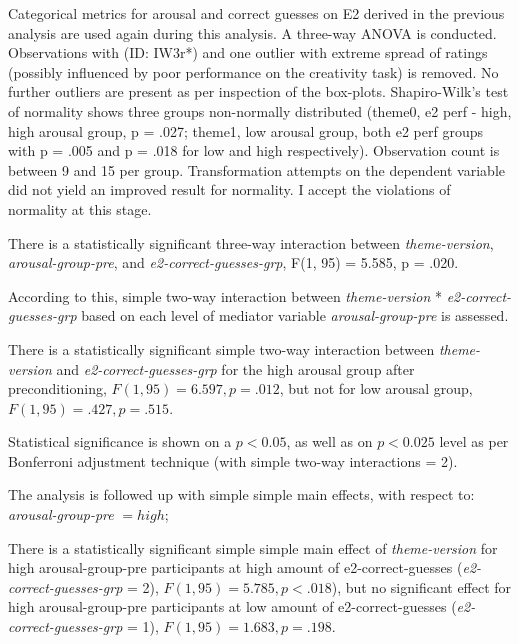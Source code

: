 	Categorical metrics for arousal and correct guesses on E2 derived in the previous analysis are used again during this analysis. A three-way ANOVA is conducted. Observations with (ID: IW3r*) and one outlier with extreme spread of ratings (possibly influenced by poor performance on the creativity task) is removed. No further outliers are present as per inspection of the box-plots.
	Shapiro-Wilk's test of normality shows three groups non-normally distributed (theme0, e2 perf - high, high arousal group, p = .027; theme1, low arousal group, both e2 perf groups with p = .005 and p = .018 for low and high respectively). Observation count is between 9 and 15 per group. Transformation attempts on the dependent variable did not yield an improved result for normality. I accept the violations of normality at this stage.
			      
	There is a statistically significant three-way interaction between \textit{theme-version}, \textit{arousal-group-pre}, and \textit{e2-correct-guesses-grp}, 
	F(1, 95) = 5.585, p = .020.
	
	According to this, simple two-way interaction between \textit{theme-version} * \textit{e2-correct-guesses-grp} based on each level of mediator variable \textit{arousal-group-pre} is assessed.
	
	There is a statistically significant simple two-way interaction between \textit{theme-version} and \textit{e2-correct-guesses-grp} for the high arousal group after preconditioning, \(F(1, 95) = 6.597, p = .012\), but not for low arousal group, \(F(1, 95) = .427, p = .515\).
	
	Statistical significance is shown on a $ p < 0.05 $, as well as on $ p < 0.025 $ level as per Bonferroni adjustment technique (with simple two-way interactions = 2).
	
	The analysis is followed up with simple simple main effects, with respect to: \textit{arousal-group-pre} $ = high $;
	
	
	There is a statistically significant simple simple main effect of \textit{theme-version} for high arousal-group-pre participants  at high amount of e2-correct-guesses (\textit{e2-correct-guesses-grp} = 2), 
	$ F(1, 95) = 5.785, p < .018 $), 
	but no significant effect for high arousal-group-pre participants at low amount of e2-correct-guesses (\textit{e2-correct-guesses-grp} = 1),
	$ F(1, 95) = 1.683, p = .198 $. 
	
